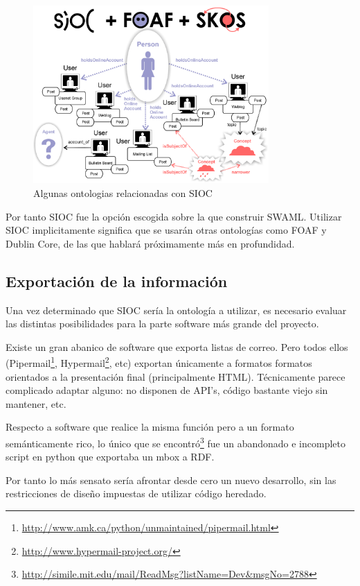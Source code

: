 \begin{figure}[H]
	\centering
	\includegraphics[width=9cm]{images/sioc-foaf-skos.png}
	\caption{Algunas ontologias relacionadas con SIOC}
	\label{fig:sioc+foaf+skos}
\end{figure}

Por tanto SIOC fue la opción escogida sobre la que construir SWAML. Utilizar SIOC
implicitamente significa que se usarán otras ontologías como FOAF y Dublin Core,
de las que hablará próximamente más en profundidad.


\subsection{Exportación de la información}

Una vez determinado que SIOC sería la ontología a utilizar, es necesario evaluar
las distintas posibilidades para la parte software más grande del proyecto.

Existe un gran abanico de software que exporta listas de correo. Pero todos
ellos (Pipermail\footnote{\url{http://www.amk.ca/python/unmaintained/pipermail.html}},
Hypermail\footnote{\url{http://www.hypermail-project.org/}}, etc) exportan únicamente
a formatos formatos orientados a la presentación final (principalmente HTML). 
Técnicamente parece complicado adaptar alguno: no disponen de API's, código bastante
viejo sin mantener, etc.

Respecto a software que realice la misma función pero a un formato semánticamente 
rico, lo único que se encontró\footnote{\url{http://simile.mit.edu/mail/ReadMsg?listName=Dev&msgNo=2788}} 
fue un abandonado e incompleto script en python que exportaba un mbox a RDF.

Por tanto lo más sensato sería afrontar desde cero un nuevo desarrollo, sin las 
restricciones de diseño impuestas de utilizar código heredado.

